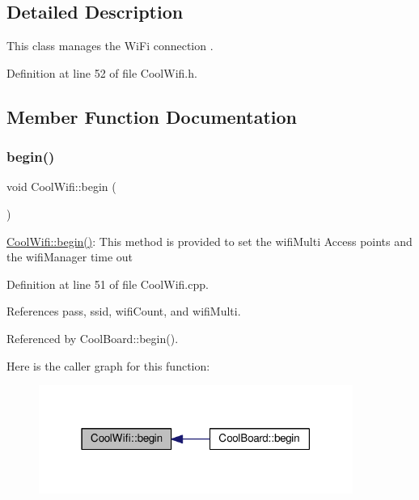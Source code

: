 \subsection{Detailed Description}
This class manages the Wi\+Fi connection . 

Definition at line 52 of file Cool\+Wifi.\+h.



\subsection{Member Function Documentation}
\mbox{\label{class_cool_wifi_a46942fed90e475112cc10b78a32e7aaa}} 
\subsubsection{\texorpdfstring{begin()}{begin()}}
{\footnotesize\ttfamily void Cool\+Wifi\+::begin (\begin{DoxyParamCaption}{ }\end{DoxyParamCaption})}

\hyperlink{class_cool_wifi_a46942fed90e475112cc10b78a32e7aaa}{Cool\+Wifi\+::begin()}\+: This method is provided to set the wifi\+Multi Access points and the wifi\+Manager time out 

Definition at line 51 of file Cool\+Wifi.\+cpp.



References pass, ssid, wifi\+Count, and wifi\+Multi.



Referenced by Cool\+Board\+::begin().

Here is the caller graph for this function\+:
\nopagebreak
\begin{figure}[H]
\begin{center}
\leavevmode
\includegraphics[width=291pt]{d7/d29/class_cool_wifi_a46942fed90e475112cc10b78a32e7aaa_icgraph}
\end{center}
\end{figure}
\mbox{\label{class_cool_wifi_a4eb2f6b9b09dd588964b88b6c70122c0}} 
